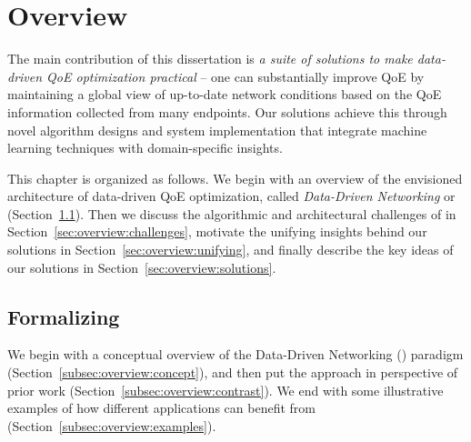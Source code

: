 \chapter{Overview}
\label{ch:overview}

The main contribution of this dissertation is {\em a suite of solutions to make 
data-driven QoE optimization practical} -- one can substantially improve QoE 
by maintaining a global view of up-to-date network conditions based on the 
QoE information collected from many endpoints.
Our solutions achieve this through novel algorithm designs and system 
implementation that integrate machine learning techniques with domain-specific
insights.

This chapter is organized as follows.
We begin with an overview of the envisioned 
architecture of data-driven QoE optimization, 
called {\em Data-Driven Networking} or {\em \ddn} (Section~\ref{sec:overview:arch}).
Then we discuss the algorithmic and architectural challenges of \ddn in 
Section~\ref{sec:overview:challenges}, motivate the unifying insights behind
our solutions in Section~\ref{sec:overview:unifying}, and finally describe
the key ideas of our solutions in Section~\ref{sec:overview:solutions}.


\section{Formalizing \ddn}
\label{sec:overview:arch}

We begin with a conceptual overview of the Data-Driven 
Networking (\ddn) paradigm (Section~\ref{subsec:overview:concept}),
and then put the \ddn approach in perspective of prior work 
(Section~\ref{subsec:overview:contrast}). We end with 
some illustrative examples of how different applications   
can benefit from \ddn (Section~\ref{subsec:overview:examples}).

